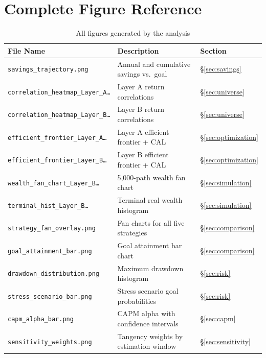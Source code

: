 \documentclass[12pt, letterpaper]{article}
\begin{document}
\newpage
\appendix
\section{Complete Figure Reference}
\label{app:figures}

\begin{table}[H]
  \centering
  \caption{All figures generated by the analysis}
  \label{tab:figs}
  \begin{tabularx}{\linewidth}{lXl}
    \toprule
    \textbf{File Name} & \textbf{Description} & \textbf{Section} \\
    \midrule
    \texttt{savings\_trajectory.png} & Annual and cumulative savings vs.\ goal & \S\ref{sec:savings} \\
    \texttt{correlation\_heatmap\_Layer\_A\ldots} & Layer A return correlations & \S\ref{sec:universe} \\
    \texttt{correlation\_heatmap\_Layer\_B\ldots} & Layer B return correlations & \S\ref{sec:universe} \\
    \texttt{efficient\_frontier\_Layer\_A\ldots} & Layer A efficient frontier + CAL & \S\ref{sec:optimization} \\
    \texttt{efficient\_frontier\_Layer\_B\ldots} & Layer B efficient frontier + CAL & \S\ref{sec:optimization} \\
    \texttt{wealth\_fan\_chart\_Layer\_B\ldots}  & 5{,}000-path wealth fan chart & \S\ref{sec:simulation} \\
    \texttt{terminal\_hist\_Layer\_B\ldots}      & Terminal real wealth histogram & \S\ref{sec:simulation} \\
    \texttt{strategy\_fan\_overlay.png}          & Fan charts for all five strategies & \S\ref{sec:comparison} \\
    \texttt{goal\_attainment\_bar.png}           & Goal attainment bar chart & \S\ref{sec:comparison} \\
    \texttt{drawdown\_distribution.png}          & Maximum drawdown histogram & \S\ref{sec:risk} \\
    \texttt{stress\_scenario\_bar.png}           & Stress scenario goal probabilities & \S\ref{sec:risk} \\
    \texttt{capm\_alpha\_bar.png}                & CAPM alpha with confidence intervals & \S\ref{sec:capm} \\
    \texttt{sensitivity\_weights.png}            & Tangency weights by estimation window & \S\ref{sec:sensitivity} \\
    \bottomrule
  \end{tabularx}
\end{table}
\end{document}
